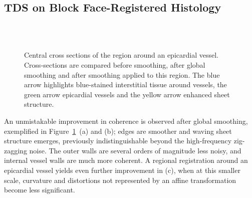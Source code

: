   \subsection{TDS on Block Face-Registered Histology} %
  \label{sub:tds_on_block_face_registered_histology}
  \begin{figure}[!t]
    \centering
    \\
    \\
    \caption{Central cross sections of the region around an epicardial vessel. Cross-sections are compared before smoothing, after global smoothing and after smoothing applied to this region. The blue arrow highlights blue-stained interstitial tissue around vessels, the green arrow epicardial vessels and the yellow arrow enhanced sheet structure.}
    \label{fig:vessel_sections}
  \end{figure}
  An unmistakable improvement in coherence is observed after global smoothing, exemplified in Figure~\ref{fig:vessel_sections}~(a) and (b); edges are smoother and waving sheet structure emerges, previously indistinguishable beyond the high-frequency zig-zagging noise. The outer walls are several orders of magnitude less noisy, and internal vessel walls are much more coherent. A regional registration around an epicardial vessel yields even further improvement in (c), when at this smaller scale, curvature and distortions not represented by an affine transformation become less significant.

